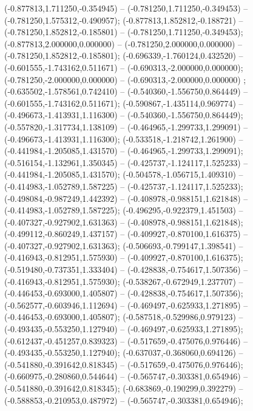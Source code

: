  (-0.877813,1.711250,-0.354945) -- (-0.781250,1.711250,-0.349453) -- (-0.781250,1.575312,-0.490957);
 (-0.877813,1.852812,-0.188721) -- (-0.781250,1.852812,-0.185801) -- (-0.781250,1.711250,-0.349453);
 (-0.877813,2.000000,0.000000) -- (-0.781250,2.000000,0.000000) -- (-0.781250,1.852812,-0.185801);
 (-0.696339,-1.760124,0.432520) -- (-0.601555,-1.743162,0.511671) -- (-0.690313,-2.000000,0.000000);
 (-0.781250,-2.000000,0.000000) -- (-0.690313,-2.000000,0.000000) ;
 (-0.635502,-1.578561,0.742410) -- (-0.540360,-1.556750,0.864449) -- (-0.601555,-1.743162,0.511671);
 (-0.590867,-1.435114,0.969774) -- (-0.496673,-1.413931,1.116300) -- (-0.540360,-1.556750,0.864449);
 (-0.557820,-1.317734,1.138109) -- (-0.464965,-1.299733,1.299091) -- (-0.496673,-1.413931,1.116300);
 (-0.533518,-1.218742,1.261900) -- (-0.441984,-1.205085,1.431570) -- (-0.464965,-1.299733,1.299091);
 (-0.516154,-1.132961,1.350345) -- (-0.425737,-1.124117,1.525233) -- (-0.441984,-1.205085,1.431570);
 (-0.504578,-1.056715,1.409310) -- (-0.414983,-1.052789,1.587225) -- (-0.425737,-1.124117,1.525233);
 (-0.498084,-0.987249,1.442392) -- (-0.408978,-0.988151,1.621848) -- (-0.414983,-1.052789,1.587225);
 (-0.496295,-0.922379,1.451503) -- (-0.407327,-0.927902,1.631363) -- (-0.408978,-0.988151,1.621848);
 (-0.499112,-0.860249,1.437157) -- (-0.409927,-0.870100,1.616375) -- (-0.407327,-0.927902,1.631363);
 (-0.506693,-0.799147,1.398541) -- (-0.416943,-0.812951,1.575930) -- (-0.409927,-0.870100,1.616375);
 (-0.519480,-0.737351,1.333404) -- (-0.428838,-0.754617,1.507356) -- (-0.416943,-0.812951,1.575930);
 (-0.538267,-0.672949,1.237707) -- (-0.446453,-0.693000,1.405807) -- (-0.428838,-0.754617,1.507356);
 (-0.562577,-0.603946,1.112694) -- (-0.469497,-0.625933,1.271895) -- (-0.446453,-0.693000,1.405807);
 (-0.587518,-0.529986,0.979123) -- (-0.493435,-0.553250,1.127940) -- (-0.469497,-0.625933,1.271895);
 (-0.612437,-0.451257,0.839323) -- (-0.517659,-0.475076,0.976446) -- (-0.493435,-0.553250,1.127940);
 (-0.637037,-0.368060,0.694126) -- (-0.541880,-0.391642,0.818345) -- (-0.517659,-0.475076,0.976446);
 (-0.660975,-0.280860,0.544644) -- (-0.565747,-0.303381,0.654946) -- (-0.541880,-0.391642,0.818345);
 (-0.683869,-0.190299,0.392279) -- (-0.588853,-0.210953,0.487972) -- (-0.565747,-0.303381,0.654946);
